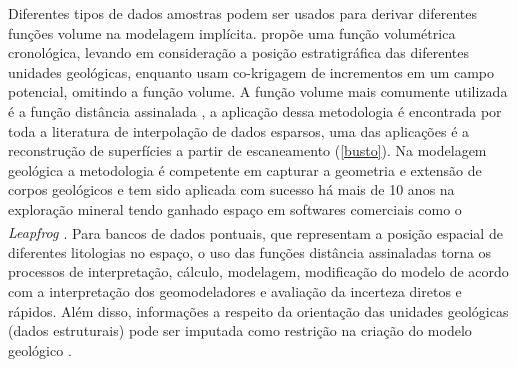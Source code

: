 Diferentes tipos de dados amostras podem ser usados para derivar diferentes funções volume na modelagem implícita.  propõe uma função volumétrica cronológica, levando em consideração a posição estratigráfica das diferentes unidades geológicas, enquanto  usam co-krigagem de incrementos em um campo potencial, omitindo a função volume. A função volume mais comumente utilizada é a função distância assinalada \cite{osherlevelsetmethods}, a aplicação dessa metodologia é encontrada por toda a literatura de interpolação de dados esparsos, uma das aplicações é a reconstrução de superfícies a partir de escaneamento (\autoref{busto}). Na modelagem geológica a metodologia é competente em capturar a geometria e extensão de corpos geológicos e tem sido aplicada com sucesso há mais de 10 anos na exploração mineral tendo ganhado espaço em softwares comerciais como o \textit{Leapfrog \textsuperscript{\textregistered}}. Para bancos de dados pontuais, que representam a posição espacial de diferentes litologias no espaço, o uso das funções distância assinaladas torna os processos de interpretação, cálculo, modelagem, modificação do modelo de acordo com a interpretação dos geomodeladores e avaliação da incerteza diretos e rápidos. Além disso, informações a respeito da orientação das unidades geológicas (dados estruturais) pode ser imputada como restrição na criação do modelo geológico \cite{martin2017implicitmodeling}.
